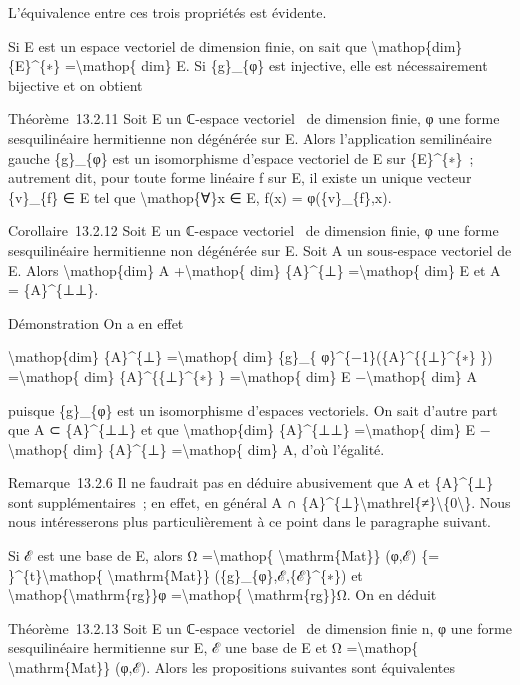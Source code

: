 \documentclass[]{article}
\begin{document}
L'équivalence entre ces trois propriétés est évidente.

Si E est un espace vectoriel de dimension finie, on sait que
\textbackslash{}mathop\{dim\} \{E\}\^{}\{∗\} =\textbackslash{}mathop\{
dim\} E. Si \{g\}\_\{φ\} est injective, elle est nécessairement
bijective et on obtient

Théorème~13.2.11 Soit E un ℂ-espace vectoriel ~de dimension finie, φ une
forme sesquilinéaire hermitienne non dégénérée sur E. Alors
l'application semilinéaire gauche \{g\}\_\{φ\} est un isomorphisme
d'espace vectoriel de E sur \{E\}\^{}\{∗\}~; autrement dit, pour toute
forme linéaire f sur E, il existe un unique vecteur \{v\}\_\{f\} ∈ E tel
que \textbackslash{}mathop\{∀\}x ∈ E, f(x) = φ(\{v\}\_\{f\},x).

Corollaire~13.2.12 Soit E un ℂ-espace vectoriel ~de dimension finie, φ
une forme sesquilinéaire hermitienne non dégénérée sur E. Soit A un
sous-espace vectoriel de E. Alors \textbackslash{}mathop\{dim\} A
+\textbackslash{}mathop\{ dim\} \{A\}\^{}\{⊥\} =\textbackslash{}mathop\{
dim\} E et A = \{A\}\^{}\{⊥⊥\}.

Démonstration On a en effet

\textbackslash{}mathop\{dim\} \{A\}\^{}\{⊥\} =\textbackslash{}mathop\{
dim\} \{g\}\_\{ φ\}\^{}\{−1\}(\{A\}\^{}\{\{⊥\}\^{}\{∗\} \})
=\textbackslash{}mathop\{ dim\} \{A\}\^{}\{\{⊥\}\^{}\{∗\} \}
=\textbackslash{}mathop\{ dim\} E −\textbackslash{}mathop\{ dim\} A

puisque \{g\}\_\{φ\} est un isomorphisme d'espaces vectoriels. On sait
d'autre part que A ⊂ \{A\}\^{}\{⊥⊥\} et que
\textbackslash{}mathop\{dim\} \{A\}\^{}\{⊥⊥\} =\textbackslash{}mathop\{
dim\} E −\textbackslash{}mathop\{ dim\} \{A\}\^{}\{⊥\}
=\textbackslash{}mathop\{ dim\} A, d'où l'égalité.

Remarque~13.2.6 Il ne faudrait pas en déduire abusivement que A et
\{A\}\^{}\{⊥\} sont supplémentaires~; en effet, en général A ∩
\{A\}\^{}\{⊥\}\textbackslash{}mathrel\{≠\}\textbackslash{}\{0\textbackslash{}\}.
Nous nous intéresserons plus particulièrement à ce point dans le
paragraphe suivant.

Si ℰ est une base de E, alors Ω =\textbackslash{}mathop\{
\textbackslash{}mathrm\{Mat\}\} (φ,ℰ) \{=
\}\^{}\{t\}\textbackslash{}mathop\{ \textbackslash{}mathrm\{Mat\}\}
(\{g\}\_\{φ\},ℰ,\{ℰ\}\^{}\{∗\}) et
\textbackslash{}mathop\{\textbackslash{}mathrm\{rg\}\}φ
=\textbackslash{}mathop\{ \textbackslash{}mathrm\{rg\}\}Ω. On en déduit

Théorème~13.2.13 Soit E un ℂ-espace vectoriel ~de dimension finie n, φ
une forme sesquilinéaire hermitienne sur E, ℰ une base de E et Ω
=\textbackslash{}mathop\{ \textbackslash{}mathrm\{Mat\}\} (φ,ℰ). Alors
les propositions suivantes sont équivalentes
\end{document}
